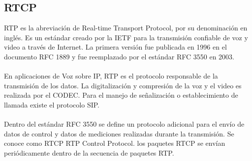 \documentclass[12pt,letterpaper]{article}
\begin{document}
\subsection{RTCP}
RTP es la abreviación de Real-time Transport Protocol, por su denominación en inglés. Es un 
estándar creado por la IETF para la transmisión confiable de voz y video a través de Internet. 
La primera versión fue publicada en 1996 en el documento RFC 1889 y fue reemplazado por el 
estándar RFC 3550 en 2003.
\\ \\
En aplicaciones de Voz sobre IP, RTP es el protocolo responsable de la transmisión de los 
datos. La digitalización y compresión de la voz y el video es realizada por el CODEC. Para 
el manejo de señalización o establecimiento de llamada existe el protocolo SIP.
\\ \\
Dentro del estándar RFC 3550 se define un protocolo adicional para el envío de datos de 
control y datos de mediciones realizadas durante la transmisión. Se conoce como RTCP RTP 
Control Protocol. los paquetes RTCP se envían periódicamente dentro de la secuencia de 
paquetes RTP.
\end{document}
